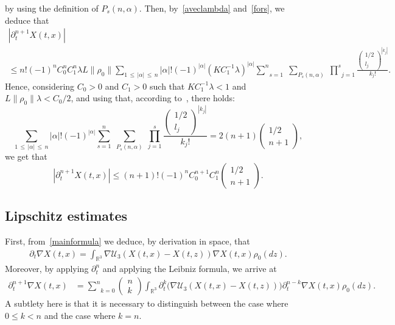 \documentclass[10pt]{amsart}
\theoremstyle{definition}\newtheorem{defi}[theo]{Definition}\newtheorem{rema}[theo]{Remark}\newtheorem{exam}[theo]{Example}\newtheorem{exem}[theo]{Example}\newtheorem{nota}[theo]{Notation}
\newcommand{\R}{\mathbb{R}}
\newcommand{\clU}{\mathcal{U}}
\renewcommand{\leq}{\leqslant}
\begin{document}
by using the definition of $P_s(n,\alpha)$. Then, by~\eqref{aveclambda} and~\eqref{fors}, we deduce that
\begin{multline*}
\left|\partial_t^{n+1} X(t,x)\right|
\\ \leq n!(-1)^n C_0^nC_1^n\lambda L\|\rho_0\|\underset{1\,\leq\,|\alpha|\,\leq\,n}{\sum}|\alpha|!(-1)^{|\alpha|} \left(K C_1^{-1} \lambda\right)^{|\alpha|}\underset{s=1}{\overset{n}{\sum}}\;\underset{P_s(n,\alpha)}{\sum}\;\underset{j=1}{\overset{s}{\prod}} \frac{
\begin{pmatrix}1/2\\ l_j
\end{pmatrix}^{|k_j|}}{k_j!}.
\end{multline*}
Hence, considering $C_0>0$ and $C_1>0$ such that $K C_1^{-1} \lambda<1 $ and $L\|\rho_0\|\lambda<C_0/2 $, and using that, according to~\cite[Lemma~3.3]{CVW}, there holds:
\begin{equation}\label{formule_magique1}
\underset{1\,\leq\,|\alpha|\,\leq\,n}{\sum}|\alpha|!(-1)^{|\alpha|} \underset{s=1}{\overset{n}{\sum}}\;\underset{P_s(n,\alpha)}{\sum}\;\underset{j=1}{\overset{s}{\prod}} \frac{
\begin{pmatrix}1/2\\ l_j
\end{pmatrix}^{|k_j|}}{k_j!}=2(n+1)
\begin{pmatrix}1/2\\ n+1
\end{pmatrix},
\end{equation}
we get that
\[
\left|\partial_t^{n+1} X(t,x)\right|\leq (n+1)!(-1)^n C_0^{n+1} C_1^n
\begin{pmatrix}1/2\\ n+1
\end{pmatrix}.
\]



\subsection{Lipschitz estimates}

First, from~\eqref{mainformula} we deduce, by derivation in space, that
\begin{align}\label{lip-e}
\partial_t \nabla X(t,x)= \int_{\R^3} \nabla \clU_3(X(t,x)-X(t,z))\nabla X(t,x) \rho_0(dz).
\end{align}
Moreover, by applying $\partial_t^{n}$ and applying the Leibniz formula, we arrive at
\begin{align*}
\partial_t^{n+1} \nabla X(t,x)&=\underset{k=0}{\overset{n}{\sum}}
\begin{pmatrix}n \\k
\end{pmatrix} \int_{\R^3} \partial_t^k \big(\nabla \clU_3(X(t,x)-X(t,z))\big) \partial_t^{n-k}\nabla X(t,x) \rho_0(dz).
\end{align*}
A subtlety here is that it is necessary to distinguish between the case where $0 \leq k<n$ and the case where $k=n$.
\end{document}
